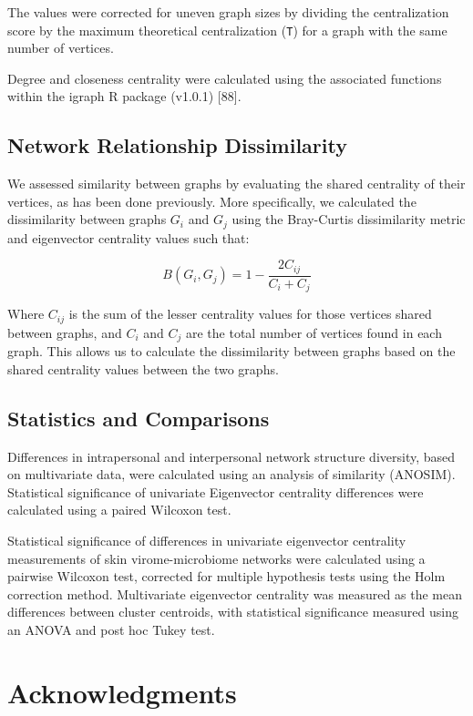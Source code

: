 \documentclass[12pt,]{article}
\begin{document}
The values were corrected for uneven graph sizes by dividing the
centralization score by the maximum theoretical centralization
(\texttt{T}) for a graph with the same number of vertices.

Degree and closeness centrality were calculated using the associated
functions within the igraph R package (v1.0.1) {[}88{]}.

\subsection{Network Relationship
Dissimilarity}\label{network-relationship-dissimilarity}

We assessed similarity between graphs by evaluating the shared
centrality of their vertices, as has been done previously. More
specifically, we calculated the dissimilarity between graphs \(G_{i}\)
and \(G_{j}\) using the Bray-Curtis dissimilarity metric and eigenvector
centrality values such that:

\[ B\left( { G }_{ i },{ G }_{ j } \right) =1-\frac { 2{ C }_{ ij } }{ { C }_{ i }+{ C }_{ j } } \]

Where \(C_{ij}\) is the sum of the lesser centrality values for those
vertices shared between graphs, and \(C_{i}\) and \(C_{j}\) are the
total number of vertices found in each graph. This allows us to
calculate the dissimilarity between graphs based on the shared
centrality values between the two graphs.

\subsection{Statistics and
Comparisons}\label{statistics-and-comparisons}

Differences in intrapersonal and interpersonal network structure
diversity, based on multivariate data, were calculated using an analysis
of similarity (ANOSIM). Statistical significance of univariate
Eigenvector centrality differences were calculated using a paired
Wilcoxon test.

Statistical significance of differences in univariate eigenvector
centrality measurements of skin virome-microbiome networks were
calculated using a pairwise Wilcoxon test, corrected for multiple
hypothesis tests using the Holm correction method. Multivariate
eigenvector centrality was measured as the mean differences between
cluster centroids, with statistical significance measured using an ANOVA
and post hoc Tukey test.

\section{Acknowledgments}\label{acknowledgments}
\end{document}

